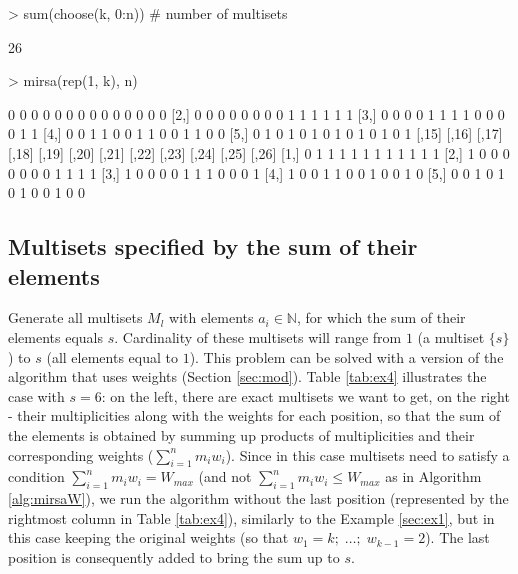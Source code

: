 \documentclass[12pt]{article}
\begin{document}
\begin{Schunk}
\begin{Sinput}
> sum(choose(k, 0:n))  # number of multisets
\end{Sinput}
\begin{Soutput}
[1] 26
\end{Soutput}
\begin{Sinput}
> mirsa(rep(1, k), n)
\end{Sinput}
\begin{Soutput}
     [,1] [,2] [,3] [,4] [,5] [,6] [,7] [,8] [,9] [,10] [,11] [,12] [,13] [,14]
[1,]    0    0    0    0    0    0    0    0    0     0     0     0     0     0
[2,]    0    0    0    0    0    0    0    0    1     1     1     1     1     1
[3,]    0    0    0    0    1    1    1    1    0     0     0     0     1     1
[4,]    0    0    1    1    0    0    1    1    0     0     1     1     0     0
[5,]    0    1    0    1    0    1    0    1    0     1     0     1     0     1
     [,15] [,16] [,17] [,18] [,19] [,20] [,21] [,22] [,23] [,24] [,25] [,26]
[1,]     0     1     1     1     1     1     1     1     1     1     1     1
[2,]     1     0     0     0     0     0     0     0     1     1     1     1
[3,]     1     0     0     0     0     1     1     1     0     0     0     1
[4,]     1     0     0     1     1     0     0     1     0     0     1     0
[5,]     0     0     1     0     1     0     1     0     0     1     0     0
\end{Soutput}
\end{Schunk}

\subsection{Multisets specified by the sum of their elements} \label{sec:ex4}

Generate all multisets $M_l$ with elements $a_i \in \mathbb{N}$, for which the sum of their elements equals $s$. Cardinality of these multisets will range from $1$ (a multiset $\{s\}$) to $s$ (all elements equal to $1$). This problem can be solved with a version of the algorithm that uses weights (Section \ref{sec:mod}). Table \ref{tab:ex4} illustrates the case with $s = 6$: on the left, there are exact multisets we want to get, on the right - their multiplicities along with the weights for each position, so that the sum of the elements is obtained by summing up products of multiplicities and their corresponding weights ($\sum_{i = 1}^n m_i w_i$). Since in this case multisets need to satisfy a condition $\sum_{i = 1}^n m_i w_i = W_{max}$ (and not $\sum_{i = 1}^n m_i w_i \leqslant W_{max}$ as in Algorithm \ref{alg:mirsaW}), we run the algorithm without the last position (represented by the rightmost column in Table \ref{tab:ex4}), similarly to the Example \ref{sec:ex1}, but in this case keeping the original weights (so that $w_1 = k; \; \dotsc; \; w_{k - 1} = 2$). The last position is consequently added to bring the sum up to $s$. \\
\end{document}

